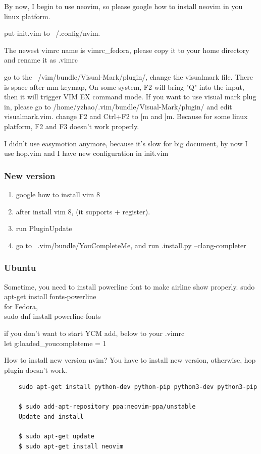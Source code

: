 \documentclass[paper=8.5in:11in, twoside, 12pt, pagesize=pdftex]{book}
\begin{document}
By now, I begin to use neovim, so please google how to install neovim in you linux platform.


put init.vim to ~/.config/nvim.

The newest vimrc name is vimrc\_fedora, please copy it to your home directory and rename it as .vimrc

go to the  ~/vim/bundle/Visual-Mark/plugin/, change the visualmark file. There is space after mm keymap,  On some system, F2 will bring "Q" into the input, then it will trigger VIM EX command mode.  If you want to use visual mark plug in, please go to /home/yzhao/.vim/bundle/Visual-Mark/plugin/ and edit visualmark.vim. change F2 and Ctrl+F2 to [m and ]m. Because for some linux platform, F2 and F3 doesn't work properly.

I didn't use easymotion anymore, because it's slow for big document, by now I use hop.vim and I have new configuration in init.vim

\subsubsection{New version}

\begin{enumerate}
	\item google how to install vim 8
	\item after install vim 8, (it supports + register).
	\item run PluginUpdate
	\item go to ~.vim/bundle/YouCompleteMe, and run .install.py --clang-completer
\end{enumerate}

\subsubsection{Ubuntu}

Sometime, you need to install powerline font to make airline show properly.
sudo apt-get install fonts-powerline \\
for Fedora, \\
sudo dnf install powerline-fonts


if you don't want to start YCM add, below to your .vimrc \\
let g:loaded\_youcompleteme = 1

How to install new version nvim? You have to install new version, otherwise, hop plugin doesn't work. 
\begin{verbatim}
	sudo apt-get install python-dev python-pip python3-dev python3-pip
	
	$ sudo add-apt-repository ppa:neovim-ppa/unstable 
	Update and install
	
	$ sudo apt-get update
	$ sudo apt-get install neovim
\end{verbatim}	
\end{document}
